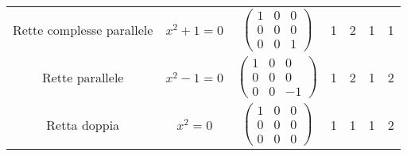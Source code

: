 \begin{tabular}{|c|c|c|c|c|c|c|}
  Rette complesse parallele&$x^2+1=0$&$\left(\begin{smallmatrix} 1 & 0 & 0 \\ 0 & 0 & 0 \\ 0 & 0 & 1 \end{smallmatrix}\right)$&1&2&1&1\\
  Rette parallele&$x^2-1=0$&$\left(\begin{smallmatrix} 1 & 0 & 0 \\ 0 & 0 & 0 \\ 0 & 0 & -1 \end{smallmatrix}\right)$&1&2&1&2\\
  Retta doppia&$x^2=0$&$\left(\begin{smallmatrix} 1 & 0 & 0 \\ 0 & 0 & 0 \\ 0 & 0 & 0 \end{smallmatrix}\right)$&1&1&1&2\\
  \hline
 \end{tabular}
 
